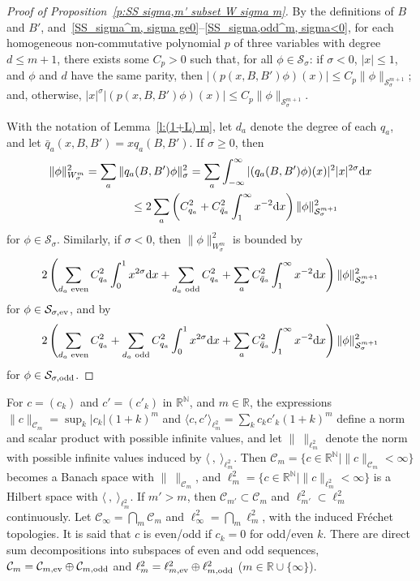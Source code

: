 \documentclass[pdftex]{sigma}
\newcommand{\R}{\mathbb{R}}
\newcommand{\N}{\mathbb{N}}
\newcommand{\CC}{\mathcal{C}}
\renewcommand{\SS}{\mathcal{S}}
\begin{document}
\begin{proof}[Proof of Proposition~\ref{p:SS sigma,m' subset W sigma m}]
  By the def\/initions of $B$ and $B'$, and~\eqref{SS_sigma^m, sigma ge0}--\eqref{SS_sigma,odd^m, sigma<0}, for each homogeneous non-commutative polynomial $p$ of three variables with degree $d\le m+1$, there exists some $C_p>0$ such that, for all $\phi\in\SS_\sigma$: if $\sigma<0$, $|x|\le1$, and $\phi$ and $d$ have the same parity, then $|(p(x,B,B')\phi)(x)|\le C_p \|\phi\|_{\SS_\sigma^{m+1}}$; and, otherwise, $|x|^\sigma |(p(x,B,B')\phi)(x)|\le C_p \|\phi\|_{\SS_\sigma^{m+1}}$.

  With the notation of Lemma~\ref{l:(1+L) m}, let $d_a$ denote the degree of each $q_a$, and let $\bar q_a(x,B,B')=x q_a(B,B')$. If $\sigma\ge0$, then
    \begin{gather*}
      \|\phi\|_{W_\sigma^m}^2=\sum_a\|q_a(B,B')\phi\|_\sigma^2
      =\sum_a\int_{-\infty}^\infty|(q_a(B,B')\phi)(x)|^2 |x|^{2\sigma}{\rm d}x\\
\hphantom{\|\phi\|_{W_\sigma^m}^2=}{} \le 2\sum_a\left(C_{q_a}^2+C_{\bar q_a}^2\int_1^\infty x^{-2}{\rm d}x\right)\|\phi\|_{\SS_\sigma^{m+1}}^2
    \end{gather*}
for $\phi\in\SS_\sigma$. Similarly, if $\sigma<0$, then $\|\phi\|_{W_\sigma^m}^2$ is bounded by
    \[
      2\left(\sum_{\text{\rm$d_a$ even}}C_{q_a}^2\int_0^1x^{2\sigma}{\rm d}x
      +\sum_{\text{\rm$d_a$ odd}}C_{q_a}^2+\sum_aC_{\bar q_a}^2\int_1^\infty x^{-2}{\rm d}x\right)\|\phi\|_{\SS_\sigma^{m+1}}^2
    \]
   for $\phi\in\SS_{\sigma,\text{\rm ev}}$, and by
     \[
      2\left(\sum_{\text{\rm$d_a$ even}}C_{q_a}^2+\sum_{\text{\rm$d_a$ odd}}C_{q_a}^2\int_0^1x^{2\sigma}{\rm d}x
      +\sum_aC_{\bar q_a}^2\int_1^\infty x^{-2}{\rm d}x\right)\|\phi\|_{\SS_\sigma^{m+1}}^2
    \]
  for $\phi\in\SS_{\sigma,\text{\rm odd}}$.
\end{proof}

For $c=(c_k)$ and $c'=(c'_k)$ in $\R^{\N}$, and $m\in\R$, the expressions $\|c\|_{\CC_m}=\sup_k|c_k|(1+k)^m$ and $\langle c,c'\rangle_{\ell^2_m}=\sum_kc_kc'_k(1+k)^m$ def\/ine a norm and scalar product with possible inf\/inite values, and let $\|\ \|_{\ell^2_m}$ denote the norm with possible inf\/inite values induced by $\langle\ ,\ \rangle_{\ell^2_m}$. Then $\CC_m=\{c\in\R^{\N}\mid\|c\|_{\CC_m}<\infty\}$ becomes a Banach space with $\|\ \|_{\CC_m}$, and $\ell^2_m=\{c\in\R^{\N}\mid\|c\|_{\ell^2_m}<\infty\}$ is a Hilbert space with $\langle\ ,\ \rangle_{\ell^2_m}$. If $m'>m$, then $\CC_{m'}\subset\CC_m$ and $\ell^2_{m'}\subset\ell^2_m$ continuously. Let $\CC_\infty=\bigcap_m\CC_m$ and $\ell^2_\infty=\bigcap_m\ell^2_m$, with the induced Fr\'echet topologies. It is said that $c$ is even/odd if $c_k=0$ for odd/even $k$. There are direct sum decompositions into subspaces of even and odd sequences, $\CC_m=\CC_{m,\text{\rm ev}}\oplus\CC_{m,\text{\rm odd}}$ and $\ell^2_m=\ell^2_{m,\text{\rm ev}}\oplus\ell^2_{m,\text{\rm odd}}$ ($m\in\R\cup\{\infty\}$).
\end{document}
